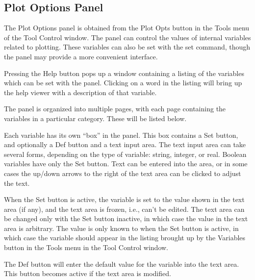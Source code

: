 \subsection{Plot Options Panel}
\label{plotopts}

The {\cb Plot Options} panel is obtained from the {\cb Plot Opts}
button in the {\cb Tools} menu of the {\cb Tool Control} window.  The
panel can control the values of internal variables related to
plotting.  These variables can also be set with the {\cb set} command,
though the panel may provide a more convenient interface.

Pressing the {\cb Help} button pops up a window containing a listing
of the variables which can be set with the panel.  Clicking on a word
in the listing will bring up the help viewer with a description of
that variable.

The panel is organized into multiple pages, with each page containing
the variables in a particular category.  These will be listed below.

Each variable has its own ``box'' in the panel.  This box contains a
{\cb Set} button, and optionally a {\cb Def} button and a text input
area.  The text input area can take several forms, depending on the
type of variable:  string, integer, or real.  Boolean variables have
only the {\cb Set} button.  Text can be entered into the area, or in
some cases the up/down arrows to the right of the text area can be
clicked to adjust the text.

When the {\cb Set} button is active, the variable is set to the value
shown in the text area (if any), and the text area is frozen, i.e.,
can't be edited.  The text area can be changed only with the {\cb Set}
button inactive, in which case the value in the text area is
arbitrary.  The value is only known to {\WRspice} when the {\cb Set}
button is active, in which case the variable should appear in the
listing brought up by the {\cb Variables} button in the {\cb Tools}
menu in the {\cb Tool Control} window.

The {\cb Def} button will enter the default value for the variable
into the text area.  This button becomes active if the text area is
modified.

